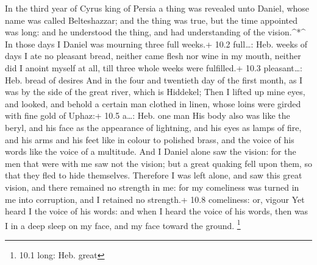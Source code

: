  In the third year of Cyrus king of Persia a thing was
revealed unto Daniel, whose name was called Belteshazzar; and the thing
was true, but the time appointed was long: and he understood the thing,
and had understanding of the vision.\^{}*\^{}  In those days
I Daniel was mourning three full weeks.+ 10.2 full\ldots: Heb. weeks of
days  I ate no pleasant bread, neither came flesh nor wine
in my mouth, neither did I anoint myself at all, till three whole weeks
were fulfilled.+ 10.3 pleasant\ldots: Heb. bread of desires 
And in the four and twentieth day of the first month, as I was by the
side of the great river, which is Hiddekel;  Then I lifted
up mine eyes, and looked, and behold a certain man clothed in linen,
whose loins were girded with fine gold of Uphaz:+ 10.5 a\ldots: Heb. one
man  His body also was like the beryl, and his face as the
appearance of lightning, and his eyes as lamps of fire, and his arms and
his feet like in colour to polished brass, and the voice of his words
like the voice of a multitude.  And I Daniel alone saw the
vision: for the men that were with me saw not the vision; but a great
quaking fell upon them, so that they fled to hide themselves.
 Therefore I was left alone, and saw this great vision, and
there remained no strength in me: for my comeliness was turned in me
into corruption, and I retained no strength.+ 10.8 comeliness: or,
vigour  Yet heard I the voice of his words: and when I heard
the voice of his words, then was I in a deep sleep on my face, and my
face toward the ground. \footnote{10.1 long: Heb. great}

